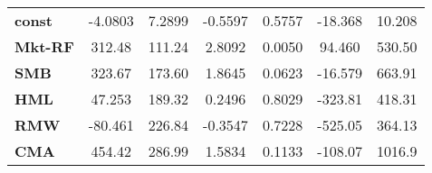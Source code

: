 \begin{center}
\begin{tabular}{lcccccc}
\midrule
\textbf{const}  &      -4.0803       &       7.2899       &     -0.5597     &      0.5757      &      -18.368      &       10.208       \\
\textbf{Mkt-RF} &       312.48       &       111.24       &      2.8092     &      0.0050      &       94.460      &       530.50       \\
\textbf{SMB}    &       323.67       &       173.60       &      1.8645     &      0.0623      &      -16.579      &       663.91       \\
\textbf{HML}    &       47.253       &       189.32       &      0.2496     &      0.8029      &      -323.81      &       418.31       \\
\textbf{RMW}    &      -80.461       &       226.84       &     -0.3547     &      0.7228      &      -525.05      &       364.13       \\
\textbf{CMA}    &       454.42       &       286.99       &      1.5834     &      0.1133      &      -108.07      &       1016.9       \\
\bottomrule
\end{tabular}
\end{center}

